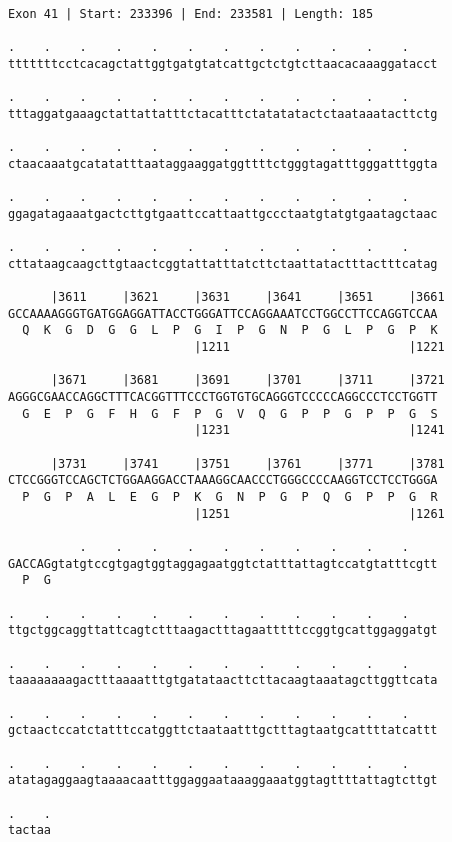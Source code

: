 \documentclass{article}
\begin{document}
\begin{Verbatim}
Exon 41 | Start: 233396 | End: 233581 | Length: 185
 
.    .    .    .    .    .    .    .    .    .    .    .    
tttttttcctcacagctattggtgatgtatcattgctctgtcttaacacaaaggatacct
  
.    .    .    .    .    .    .    .    .    .    .    .    
tttaggatgaaagctattattatttctacatttctatatatactctaataaatacttctg
  
.    .    .    .    .    .    .    .    .    .    .    .    
ctaacaaatgcatatatttaataggaaggatggttttctgggtagatttgggatttggta
  
.    .    .    .    .    .    .    .    .    .    .    .    
ggagatagaaatgactcttgtgaattccattaattgccctaatgtatgtgaatagctaac
  
.    .    .    .    .    .    .    .    .    .    .    .    
cttataagcaagcttgtaactcggtattatttatcttctaattatactttactttcatag
  
      |3611     |3621     |3631     |3641     |3651     |3661
GCCAAAAGGGTGATGGAGGATTACCTGGGATTCCAGGAAATCCTGGCCTTCCAGGTCCAA
  Q  K  G  D  G  G  L  P  G  I  P  G  N  P  G  L  P  G  P  K
                          |1211                         |1221
  
      |3671     |3681     |3691     |3701     |3711     |3721
AGGGCGAACCAGGCTTTCACGGTTTCCCTGGTGTGCAGGGTCCCCCAGGCCCTCCTGGTT
  G  E  P  G  F  H  G  F  P  G  V  Q  G  P  P  G  P  P  G  S
                          |1231                         |1241
  
      |3731     |3741     |3751     |3761     |3771     |3781
CTCCGGGTCCAGCTCTGGAAGGACCTAAAGGCAACCCTGGGCCCCAAGGTCCTCCTGGGA
  P  G  P  A  L  E  G  P  K  G  N  P  G  P  Q  G  P  P  G  R
                          |1251                         |1261
  
          .    .    .    .    .    .    .    .    .    .    
GACCAGgtatgtccgtgagtggtaggagaatggtctatttattagtccatgtatttcgtt
  P  G                                                      
  
.    .    .    .    .    .    .    .    .    .    .    .    
ttgctggcaggttattcagtctttaagactttagaatttttccggtgcattggaggatgt
  
.    .    .    .    .    .    .    .    .    .    .    .    
taaaaaaaagactttaaaatttgtgatataacttcttacaagtaaatagcttggttcata
  
.    .    .    .    .    .    .    .    .    .    .    .    
gctaactccatctatttccatggttctaataatttgctttagtaatgcattttatcattt
  
.    .    .    .    .    .    .    .    .    .    .    .    
atatagaggaagtaaaacaatttggaggaataaaggaaatggtagttttattagtcttgt
  
.    .
tactaa
\end{Verbatim}
\end{document}
